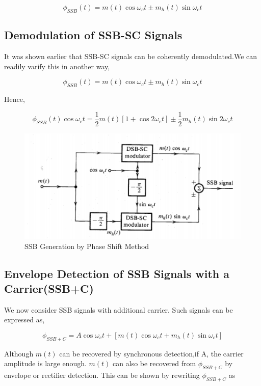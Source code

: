 \begin{equation}
	\phi_{SSB}(t)=m(t)\cos\omega_ct\pm m_h(t)\sin\omega_ct
\end{equation} 

\subsection{Demodulation of SSB-SC Signals}
It was shown earlier that SSB-SC signals can be coherently demodulated.We can readily varify this in another way,

\begin{equation}
\phi_{SSB}(t)=m(t)\cos\omega_ct\pm m_h(t)\sin\omega_ct
\end{equation} 

Hence,

\begin{equation}
\phi_{SSB}(t)\cos{\omega_ct}=\frac{1}{2}m(t)[1+\cos{2\omega_ct}]\pm \frac{1}{2} m_h(t) \sin{2\omega_ct} 
\end{equation}

\begin{figure}[H]
	\centering
	\includegraphics[]{Capture3.PNG}
	\caption{SSB Generation by Phase Shift Method}
\end{figure}


\newpage
\subsection{Envelope Detection of SSB Signals with a Carrier(SSB+C)}
We now consider SSB signals with additional carrier. Such signals can be expressed as,

\begin{equation}
	\phi_{SSB+C}=A\cos{\omega_ct}+[m(t)\cos{\omega_ct}+m_h(t)\sin{\omega_ct}]
\end{equation}

Although $m(t)$ can be recovered by synchronous detection,if A, the carrier amplitude is large enough. $m(t)$ can also be recovered from $\phi_{SSB+C}$ by envelope or rectifier detection. This can be shown by rewriting $\phi_{SSB+C}$ as

